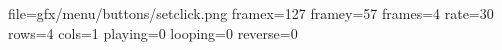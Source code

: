 file=gfx/menu/buttons/setclick.png
framex=127
framey=57
frames=4
rate=30
rows=4
cols=1
playing=0
looping=0
reverse=0